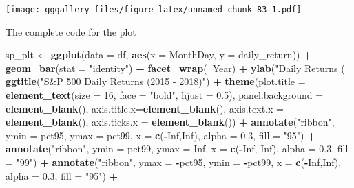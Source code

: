 \documentclass[]{book}
\newenvironment{Shaded}{\begin{snugshade}}{\end{snugshade}}
\newcommand{\DataTypeTok}[1]{\textcolor[rgb]{0.13,0.29,0.53}{#1}}
\newcommand{\DecValTok}[1]{\textcolor[rgb]{0.00,0.00,0.81}{#1}}
\newcommand{\FloatTok}[1]{\textcolor[rgb]{0.00,0.00,0.81}{#1}}
\newcommand{\KeywordTok}[1]{\textcolor[rgb]{0.13,0.29,0.53}{\textbf{#1}}}
\newcommand{\NormalTok}[1]{#1}
\newcommand{\OperatorTok}[1]{\textcolor[rgb]{0.81,0.36,0.00}{\textbf{#1}}}
\newcommand{\OtherTok}[1]{\textcolor[rgb]{0.56,0.35,0.01}{#1}}
\newcommand{\StringTok}[1]{\textcolor[rgb]{0.31,0.60,0.02}{#1}}
\begin{document}
\texttt{[image: gggallery\_files/figure-latex/unnamed-chunk-83-1.pdf]}

The complete code for the plot

\begin{Shaded}
\begin{Highlighting}[]
\NormalTok{sp_plt <-}\StringTok{ }\KeywordTok{ggplot}\NormalTok{(}\DataTypeTok{data =}\NormalTok{ df, }\KeywordTok{aes}\NormalTok{(}\DataTypeTok{x =}\NormalTok{ MonthDay, }\DataTypeTok{y =}\NormalTok{ daily_return)) }\OperatorTok{+}
\StringTok{  }\KeywordTok{geom_bar}\NormalTok{(}\DataTypeTok{stat =} \StringTok{"identity"}\NormalTok{) }\OperatorTok{+}
\StringTok{  }\KeywordTok{facet_wrap}\NormalTok{(}\OperatorTok{~}\NormalTok{Year) }\OperatorTok{+}\StringTok{ }
\StringTok{  }\KeywordTok{ylab}\NormalTok{(}\StringTok{"Daily Returns (% of Prev Close)"}\NormalTok{) }\OperatorTok{+}
\StringTok{  }\KeywordTok{ggtitle}\NormalTok{(}\StringTok{"S&P 500 Daily Returns (2015 - 2018)"}\NormalTok{) }\OperatorTok{+}\StringTok{ }
\StringTok{  }\KeywordTok{theme}\NormalTok{(}\DataTypeTok{plot.title =} \KeywordTok{element_text}\NormalTok{(}\DataTypeTok{size =} \DecValTok{16}\NormalTok{, }\DataTypeTok{face =} \StringTok{"bold"}\NormalTok{, }\DataTypeTok{hjust =} \FloatTok{0.5}\NormalTok{), }
        \DataTypeTok{panel.background =} \KeywordTok{element_blank}\NormalTok{(), }\DataTypeTok{axis.title.x=}\KeywordTok{element_blank}\NormalTok{(), }
        \DataTypeTok{axis.text.x =}  \KeywordTok{element_blank}\NormalTok{(), }\DataTypeTok{axis.ticks.x =} \KeywordTok{element_blank}\NormalTok{()) }\OperatorTok{+}\StringTok{ }
\StringTok{  }\KeywordTok{annotate}\NormalTok{(}\StringTok{"ribbon"}\NormalTok{, }\DataTypeTok{ymin =}\NormalTok{ pct95, }\DataTypeTok{ymax =}\NormalTok{ pct99, }\DataTypeTok{x =} \KeywordTok{c}\NormalTok{(}\OperatorTok{-}\OtherTok{Inf}\NormalTok{,}\OtherTok{Inf}\NormalTok{), }\DataTypeTok{alpha =} \FloatTok{0.3}\NormalTok{, }\DataTypeTok{fill =} \StringTok{"95"}\NormalTok{) }\OperatorTok{+}
\StringTok{  }\KeywordTok{annotate}\NormalTok{(}\StringTok{"ribbon"}\NormalTok{, }\DataTypeTok{ymin =}\NormalTok{ pct99, }\DataTypeTok{ymax =} \OtherTok{Inf}\NormalTok{, }\DataTypeTok{x =} \KeywordTok{c}\NormalTok{(}\OperatorTok{-}\OtherTok{Inf}\NormalTok{, }\OtherTok{Inf}\NormalTok{), }\DataTypeTok{alpha =} \FloatTok{0.3}\NormalTok{, }\DataTypeTok{fill =} \StringTok{"99"}\NormalTok{) }\OperatorTok{+}\StringTok{ }
\StringTok{  }\KeywordTok{annotate}\NormalTok{(}\StringTok{"ribbon"}\NormalTok{, }\DataTypeTok{ymax =} \OperatorTok{-}\NormalTok{pct95, }\DataTypeTok{ymin =} \OperatorTok{-}\NormalTok{pct99, }\DataTypeTok{x =} \KeywordTok{c}\NormalTok{(}\OperatorTok{-}\OtherTok{Inf}\NormalTok{,}\OtherTok{Inf}\NormalTok{), }\DataTypeTok{alpha =} \FloatTok{0.3}\NormalTok{, }\DataTypeTok{fill =} \StringTok{"95"}\NormalTok{) }\OperatorTok{+}\StringTok{ }
}
\end{Highlighting}
\end{Shaded}
\end{document}
